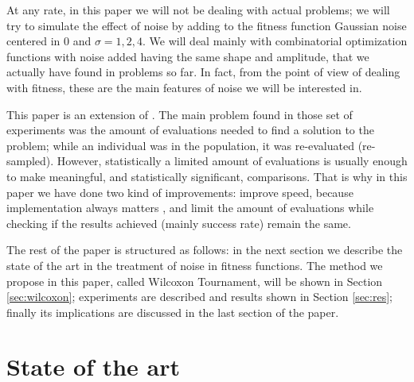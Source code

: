 \documentclass{llncs}
\begin{document}
At any rate, in this paper we will not be dealing with actual
problems; we will try to simulate the effect of noise by adding to the fitness function Gaussian noise centered in 0 and $\sigma=1,2,4$. We will deal mainly with combinatorial optimization functions with noise added having the same shape and amplitude,
that we actually have found in problems so far. In fact, from the
point of view of dealing with fitness, these are the main features of
noise we will be interested in. 

This paper is an extension of \cite{merelo14:noisy}. The main problem
found in those set of experiments was the amount of evaluations needed
to find a solution to the problem; while an individual was in the
population, it was re-evaluated (re-sampled). However, statistically a
limited amount of evaluations is usually enough to make meaningful,
and statistically significant, comparisons. That is why in this paper
we have done two kind of improvements: improve speed, because
implementation always matters
\cite{DBLP:conf/iwann/MereloRACML11},
and limit the amount of evaluations while checking if the results
achieved (mainly success rate) remain the same.  

The rest of the paper is structured as follows: in the next section we describe the
state of the art in the treatment of noise in fitness functions. The
method we propose in this paper, called Wilcoxon Tournament, will be
shown in Section \ref{sec:wilcoxon}; experiments are described and
results shown in Section \ref{sec:res}; finally its implications are discussed in the last section of the paper. 


\section{State of the art}
\label{sec:soa}
\end{document}

